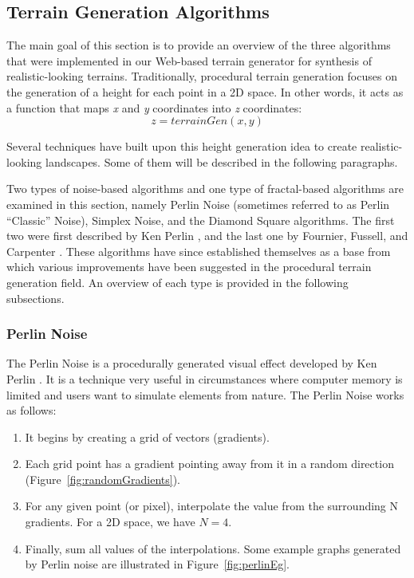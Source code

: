 \subsection{Terrain Generation Algorithms}

The main goal of this section is to provide an overview of the three algorithms that were implemented in our Web-based terrain generator for synthesis of realistic-looking terrains. Traditionally, procedural terrain generation focuses on the generation of a height for each point in a 2D space. In other words, it acts as a function that maps \textit{x} and \textit{y} coordinates into \textit{z} coordinates: \[z=terrainGen(x, y)\]

Several techniques have built upon this height generation idea to create realistic-looking landscapes. Some of them will be described in the following paragraphs.

Two types of noise-based algorithms and one type of fractal-based algorithms are examined in this section, namely Perlin Noise (sometimes referred to as Perlin ``Classic'' Noise), Simplex Noise, and the Diamond Square algorithms. The first two were first described by Ken Perlin \cite{perlin:2001, perlin:2002}, and the last one by Fournier, Fussell, and Carpenter \cite{fournier:1982}. These algorithms have since established themselves as a base from which various improvements have
been suggested \cite{ong:2005, lechner:2006, pi:2006, li:2006, doran:2010} in the  procedural terrain generation field. An overview of each type is provided in the following subsections. 

\subsubsection{Perlin Noise}
The Perlin Noise is a procedurally generated visual effect developed by Ken Perlin \cite{perlin:2002}. It is a technique very useful in circumstances where computer memory is limited and users want to simulate elements from nature. The Perlin Noise works as follows:

\begin{enumerate}
\item It begins by creating a grid of vectors (gradients).
\item Each grid point has a gradient pointing away from it in a random direction (Figure~\ref{fig:randomGradients}).
\item For any given point (or pixel), interpolate the value from the surrounding N gradients. For a 2D space, we have $ N = 4 $.
\item Finally, sum all values of the interpolations. Some example graphs generated by Perlin noise are illustrated in Figure~\ref{fig:perlinEg}.
\end{enumerate}

